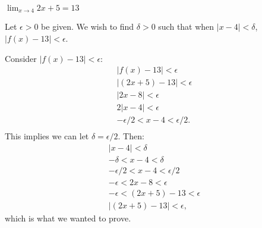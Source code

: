{$\displaystyle \lim_{x\to 4} 2x+5 = 13$}
{Let $\epsilon >0$ be given. We wish to find $\delta >0$ such that when $|x-4|<\delta$, $|f(x)-13|<\epsilon$. 

Consider $|f(x)-13|<\epsilon$:
\begin{gather*}
|f(x) -13 | < \epsilon \\
|(2x+5)-13 |<\epsilon \\
| 2x-8 | < \epsilon \\
2| x-4 | < \epsilon \\
-\epsilon/2 < x-4 < \epsilon/2. \\
\end{gather*}
This implies we can let $\delta =\epsilon/2$. Then:
\begin{gather*}
|x-4|<\delta \\
-\delta < x-4 < \delta\\
-\epsilon/2 < x-4 < \epsilon/2\\
-\epsilon < 2x-8 < \epsilon \\
-\epsilon < (2x+5)-13 < \epsilon \\
|(2x+5) - 13| < \epsilon,
\end{gather*}
which is what we wanted to prove.
}

